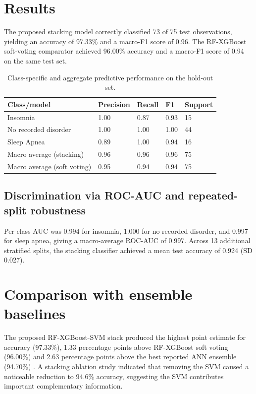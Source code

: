 \documentclass{turkjour}%
\begin{document}
\section{Results}
The proposed stacking model correctly classified 73 of 75 test observations, yielding an accuracy of 97.33\% and a macro-F1 score of 0.96. The RF-XGBoost soft-voting comparator achieved 96.00\% accuracy and a macro-F1 score of 0.94 on the same test set.

\begin{table}[htbp]
\centering
\caption{Class-specific and aggregate predictive performance on the hold-out set.}
\label{tab:performance}
\begin{tabular}{lllll}
\toprule
\textbf{Class/model} & \textbf{Precision} & \textbf{Recall} & \textbf{F1} & \textbf{Support} \\
\midrule
Insomnia & 1.00 & 0.87 & 0.93 & 15 \\
No recorded disorder & 1.00 & 1.00 & 1.00 & 44 \\
Sleep Apnea & 0.89 & 1.00 & 0.94 & 16 \\
\midrule
Macro average (stacking) & 0.96 & 0.96 & 0.96 & 75 \\
Macro average (soft voting) & 0.95 & 0.94 & 0.94 & 75 \\
\bottomrule
\end{tabular}
\end{table}

\subsection{Discrimination via ROC-AUC and repeated-split robustness}
Per-class AUC was 0.994 for insomnia, 1.000 for no recorded disorder, and 0.997 for sleep apnea, giving a macro-average ROC-AUC of 0.997. Across 13 additional stratified splits, the stacking classifier achieved a mean test accuracy of 0.924 (SD 0.027).

\section{Comparison with ensemble baselines}
The proposed RF-XGBoost-SVM stack produced the highest point estimate for accuracy (97.33\%), 1.33 percentage points above RF-XGBoost soft voting (96.00\%) and 2.63 percentage points above the best reported ANN ensemble (94.70\%) \cite{Alom2024}. A stacking ablation study indicated that removing the SVM caused a noticeable reduction to 94.6\% accuracy, suggesting the SVM contributes important complementary information.
\end{document}
